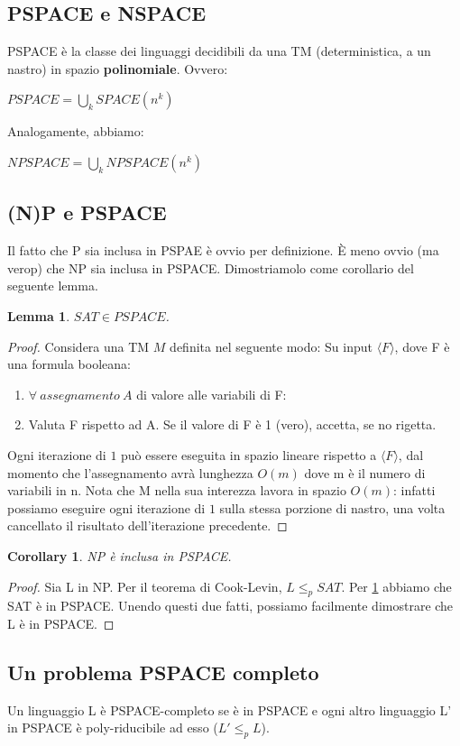 \documentclass[a4paper, 12pt]{article}
\newtheorem{lemma}[theorem]{Lemma}
\newtheorem{corollary}{Corollary}[theorem]
\begin{document}
\subsection{PSPACE e NSPACE}
PSPACE \`e la classe dei linguaggi decidibili da una TM (deterministica, a un nastro) in spazio \textbf{polinomiale}. Ovvero:
\begin{center}
$PSPACE = \bigcup_k SPACE(n^{k})$
\end{center}
Analogamente, abbiamo:
\begin{center}
$NPSPACE = \bigcup_k NPSPACE(n^{k})$
\end{center}
\subsection{(N)P e PSPACE}
Il fatto che P sia inclusa in PSPAE \`e ovvio per definizione. \`E meno ovvio (ma verop) che NP sia inclusa in PSPACE. Dimostriamolo come corollario del seguente lemma.
\begin{lemma}
\label{lemma:2}
$SAT \in PSPACE$.
\end{lemma}
\begin{proof}
Considera una TM $M$ definita nel seguente modo:
Su input $\langle F \rangle$, dove F \`e una formula booleana:

\begin{enumerate}
\item $\forall\ assegnamento\ A$ di valore alle variabili di F:
\item Valuta F rispetto ad A. Se il valore di F \`e 1 (vero), accetta, se no rigetta.
\end{enumerate}
Ogni iterazione di $1$ pu\`o essere eseguita in spazio lineare rispetto a $\langle F \rangle$, dal momento che l'assegnamento avr\`a lunghezza $O(m)$ dove m \`e il numero di variabili in n. Nota che M nella sua interezza lavora in spazio $O(m)$: infatti possiamo eseguire ogni iterazione di $1$ sulla stessa porzione di nastro, una volta cancellato il risultato dell'iterazione precedente.
\end{proof}
\begin{corollary}
NP \`e inclusa in PSPACE.
\end{corollary}
\begin{proof}
Sia L in NP. Per il teorema di Cook-Levin, $L \leq_p SAT$. Per \ref{lemma:2} abbiamo che SAT \`e in PSPACE. Unendo questi due fatti, possiamo facilmente dimostrare che L \`e in PSPACE.
\end{proof}
\subsection{Un problema PSPACE completo}
Un linguaggio L \`e PSPACE-completo se \`e in PSPACE e ogni altro linguaggio L' in PSPACE \`e poly-riducibile ad esso ($L' \leq_p L$).
\end{document}
